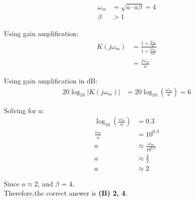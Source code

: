 \documentclass[journal,12pt,twocolumn]{IEEEtran}
\theoremstyle{remark}
\begin{document}
    \begin{align}
    \omega_m &= \sqrt{ a \cdot a \beta}=4 \\
    \beta &> 1
    \end{align}
    
    Using gain amplification:
    \begin{align}
    K(j\omega_m) &= \frac{1 + \frac{j\omega_m}{a}}{1 + \frac{j\omega_m}{a\beta}} \\
    &= \frac{j\omega_m}{a}
    \end{align}
    
    Using gain amplification in dB:
    \begin{align}
    20\log_{10}|K(j\omega_m)| &= 20\log_{10}\left(\frac{\omega_m}{a}\right) = 6
    \end{align}
    
    Solving for \(a\):
    \begin{align}
    \log_{10}\left(\frac{\omega_m}{a}\right) &= 0.3 \\
    \frac{\omega_m}{a} &= 10^{0.3} \\
    a &\approx \frac{\omega_m}{10^{0.3}} \\
    a &\approx \frac{4}{2} \\
    a &\approx 2
    \end{align}
    
    Since \(a \approx 2\), and \(\beta\) = 4, \\
     Therefore,the correct answer is \textbf{(B) 2, 4}.
    
\end{document}
